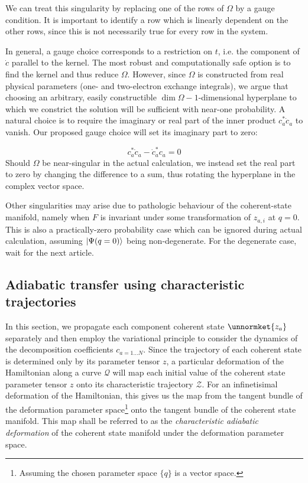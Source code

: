 \documentclass[12pt]{article}
\begin{document}
	We can treat this singularity by replacing one of the rows of $\Omega$ by a gauge condition. It is important to identify a row which is linearly dependent on the other rows, since this is not necessarily true for every row in the system.
	
	In general, a gauge choice corresponds to a restriction on $t$, i.e. the component of $\dot{c}$ parallel to the kernel. The most robust and computationally safe option is to find the kernel and thus reduce $\Omega$. However, since $\Omega$ is constructed from real physical parameters (one- and two-electron exchange integrals), we argue that choosing an arbitrary, easily constructible $\dim\Omega - 1$-dimensional hyperplane to which we constrict the solution will be sufficient with near-one probability. A natural choice is to require the imaginary or real part of the inner product $c_a^* \dot{c}_a$ to vanish. Our proposed gauge choice will set its imaginary part to zero:
	
	\begin{equation}
	c_a^* \dot{c}_a - \dot{c}_a^* c_a = 0
	\end{equation}
	Should $\Omega$ be near-singular in the actual calculation, we instead set the real part to zero by changing the difference to a sum, thus rotating the hyperplane in the complex vector space.
	
	Other singularities may arise due to pathologic behaviour of the coherent-state manifold, namely when $F$ is invariant under some transformation of $z_{a,i}$ at $q = 0$. This is also a practically-zero probability case which can be ignored during actual calculation, assuming $\ket{\Psi(q = 0)}$ being non-degenerate. For the degenerate case, wait for the next article.
	
	
	\subsection{Adiabatic transfer using characteristic trajectories}
	
	In this section, we propagate each component coherent state $\unnormket{z_a}$ separately and then employ the variational principle to consider the dynamics of the decomposition coefficients $c_{a = 1\dots N}$. Since the trajectory of each coherent state is determined only by its parameter tensor $z$, a particular deformation of the Hamiltonian along a curve $\mathcal{Q}$ will map each initial value of the coherent state parameter tensor $z$ onto its characteristic trajectory $\mathcal{Z}$. For an infinetisimal deformation of the Hamiltonian, this gives us the map from the tangent bundle of the deformation parameter space\footnote{Assuming the chosen parameter space $\{q\}$ is a vector space.} onto the tangent bundle of the coherent state manifold. This map shall be referred to as the \textit{characteristic adiabatic deformation} of the coherent state manifold under the deformation parameter space.
	
\end{document}

